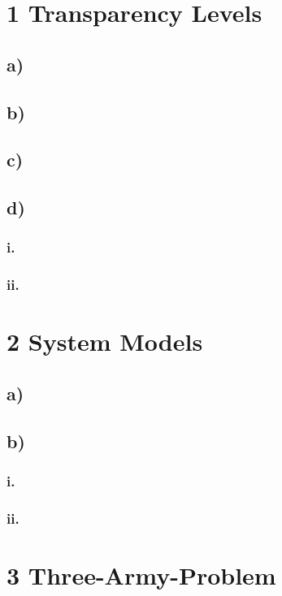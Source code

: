 \documentclass{scrartcl}
\author{Felix Bühler\\2973410 \and Clemens Lieb\\xxxxxxx \and Deus\\xxxxxxx \and Fabian Bühler\\xxxxxxx}
\title{\gettitle}
\subtitle{\getsubtitle}
\begin{document}
\maketitle

\section*{1 Transparency Levels}
\subsection*{a)}
\subsection*{b)}
\subsection*{c)}
\subsection*{d)}
\subsubsection*{i.}
\subsubsection*{ii.}

\section*{2 System Models}
\subsection*{a)}
\subsection*{b)}
\subsubsection*{i.}
\subsubsection*{ii.}

\section*{3 Three-Army-Problem}
\end{document}
